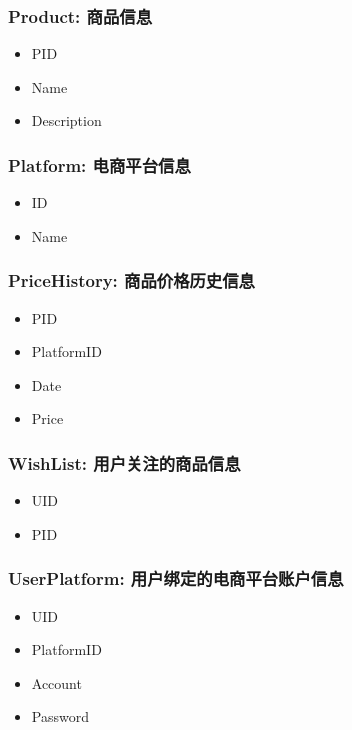 \subsubsection{Product: 商品信息}

\begin{itemize}
  \item PID
  \item Name
  \item Description
\end{itemize}

\subsubsection{Platform: 电商平台信息}

\begin{itemize}
  \item ID
  \item Name
\end{itemize}

\subsubsection{PriceHistory: 商品价格历史信息}

\begin{itemize}
  \item PID
  \item PlatformID
  \item Date
  \item Price
\end{itemize}

\subsubsection{WishList: 用户关注的商品信息}

\begin{itemize}
  \item UID
  \item PID
\end{itemize}

\subsubsection{UserPlatform: 用户绑定的电商平台账户信息}

\begin{itemize}
  \item UID
  \item PlatformID
  \item Account
  \item Password
\end{itemize}

